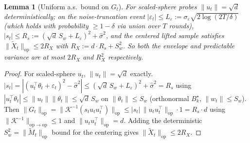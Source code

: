 \documentclass{article}
\newcommand{\op}{\mathrm{op}}
\newtheorem{lemma}[theorem]{Lemma}
\begin{document}
\begin{lemma}[Uniform a.s.\ bound on $G_t$]
\label{lem:G_bound_conf}
For scaled-sphere probes $\|u_t\| = \sqrt d$ deterministically; on
the noise-truncation event $|\varepsilon_t|\le L_\varepsilon :=
\sigma_\varepsilon\sqrt{2\log(2T/\delta)}$ (which holds with
probability $\ge 1-\delta$ via union over $T$ rounds), $|s_t|\le R_s
:= (\sqrt d\,S_w + L_\varepsilon)^2 + \widehat\sigma^2$, and the centered
lifted sample satisfies $\|\tilde X_t\|_\op \le 2R_X$ with
$R_X := d\cdot R_s + S_w^2$. So both the envelope and predictable
variance are at most $2R_X$ and $R_X^2$ respectively.
\end{lemma}
\begin{proof}
For scaled-sphere $u_t$, $\|u_t\| = \sqrt d$ exactly.
$|s_t| = |(u_t^\top\theta_t + \varepsilon_t)^2 - \widehat\sigma^2|
\le (\sqrt d\,S_w + L_\varepsilon)^2 + \widehat\sigma^2 = R_s$ using
$|u_t^\top\theta_t|\le \|u_t\|\|\theta_t\|\le \sqrt d\,S_w$ on
$\|\theta_t\|\le S_w$ (orthonormal $B_k^\star$, $\|w_t\|\le S_w$).
Then $\|G_t\|_\op = \|\mathcal K^{-1}(s_t u_tu_t^\top)\|_\op
\le |s_t|\,\|u_tu_t^\top\|_\op \cdot 1 = R_s\cdot d$ using
$\|\mathcal K^{-1}\|_{\op\to\op}\le 1$ and $\|u_tu_t^\top\|_\op = d$.
Adding the deterministic $S_w^2 = \|\widetilde M_t\|_\op$ bound for
the centering gives $\|\tilde X_t\|_\op \le 2R_X$.
\end{proof}
\end{document}
